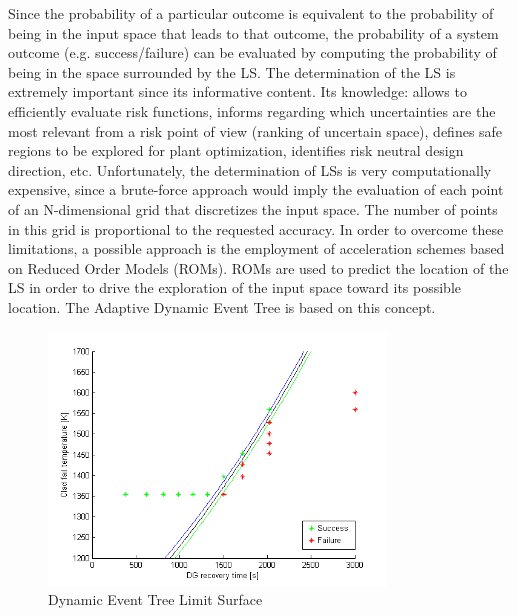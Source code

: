 Since the probability of a particular outcome is equivalent to the probability of being in the input space that leads to that outcome, the probability of a system outcome (e.g. success/failure) can be evaluated by computing the probability of being in the space surrounded by the LS.
The determination of the LS is extremely important since its informative content.  Its knowledge: allows to efficiently evaluate risk functions, informs regarding which uncertainties are the most relevant from a risk point of view (ranking of uncertain space), defines safe regions to be explored for plant optimization, identifies risk neutral design direction, etc. Unfortunately, the determination of LSs is very computationally expensive, since a brute-force approach would imply the evaluation of each point of an N-dimensional grid that discretizes the input space. The number of points in this grid is proportional to the requested accuracy. In order to overcome these limitations, a possible approach is the employment of acceleration schemes based on Reduced Order Models (ROMs). ROMs are used to predict the location of the LS in order to drive the exploration of the input space toward its possible location. The Adaptive Dynamic Event Tree is based on this concept.
\label{sec:ADET}
\begin{figure}[h]
  \centering
     \includegraphics[width=0.8\textwidth]{figures/DET_LS_pb.png}
  \caption{Dynamic Event Tree Limit Surface}
  \label{fig:LSDET}
\end{figure}
